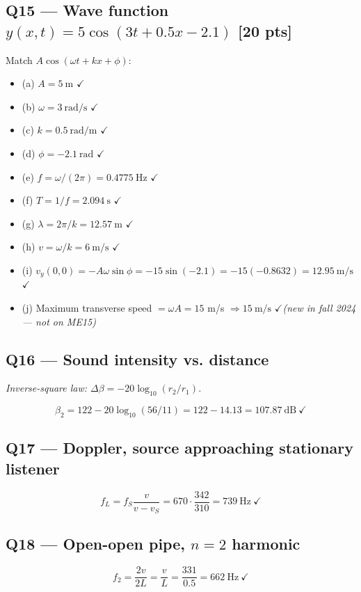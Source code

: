 \documentclass[11pt]{article}
\newcommand{\checkmk}{\ensuremath{\checkmark}}
\begin{document}
\subsection*{Q15 --- Wave function \(y(x,t) = 5\cos(3t + 0.5x - 2.1)\) [20 pts]}
Match \(A\cos(\omega t + kx + \phi)\):
\begin{itemize}[leftmargin=*]
\item (a) \(A = \boxed{5\ \mathrm{m}}\) \checkmk
\item (b) \(\omega = \boxed{3\ \mathrm{rad/s}}\) \checkmk
\item (c) \(k = \boxed{0.5\ \mathrm{rad/m}}\) \checkmk
\item (d) \(\phi = \boxed{-2.1\ \mathrm{rad}}\) \checkmk
\item (e) \(f = \omega/(2\pi) = \boxed{0.4775\ \mathrm{Hz}}\) \checkmk
\item (f) \(T = 1/f = \boxed{2.094\ \mathrm{s}}\) \checkmk
\item (g) \(\lambda = 2\pi/k = \boxed{12.57\ \mathrm{m}}\) \checkmk
\item (h) \(v = \omega/k = \boxed{6\ \mathrm{m/s}}\) \checkmk
\item (i) \(v_y(0,0) = -A\omega\sin\phi = -15\sin(-2.1) = -15(-0.8632) = \boxed{12.95\ \mathrm{m/s}}\) \checkmk
\item (j) Maximum transverse speed \(=\omega A = 15\) m/s \(\Rightarrow \boxed{15\ \mathrm{m/s}}\) \checkmk\quad\emph{(new in fall 2024 --- not on ME15)}
\end{itemize}

\subsection*{Q16 --- Sound intensity vs. distance}
\emph{Inverse-square law: \(\Delta\beta = -20\log_{10}(r_2/r_1)\).}

\[\beta_2 = 122 - 20\log_{10}(56/11) = 122 - 14.13 = \boxed{107.87\ \mathrm{dB}}\ \checkmk\]

\subsection*{Q17 --- Doppler, source approaching stationary listener}
\[f_L = f_S\frac{v}{v-v_S} = 670\cdot\frac{342}{310} = \boxed{739\ \mathrm{Hz}}\ \checkmk\]

\subsection*{Q18 --- Open-open pipe, \(n=2\) harmonic}
\[f_2 = \frac{2v}{2L} = \frac{v}{L} = \frac{331}{0.5} = \boxed{662\ \mathrm{Hz}}\ \checkmk\]
\end{document}
